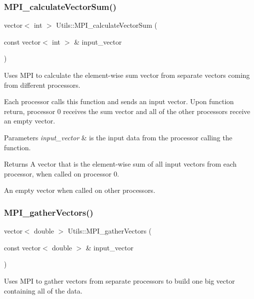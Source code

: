 \subsubsection{\texorpdfstring{M\+P\+I\+\_\+calculate\+Vector\+Sum()}{MPI\_calculateVectorSum()}\hspace{0.1cm}{\footnotesize\ttfamily [2/2]}}
{\footnotesize\ttfamily vector$<$ int $>$ Utils\+::\+M\+P\+I\+\_\+calculate\+Vector\+Sum (\begin{DoxyParamCaption}\item[{const vector$<$ int $>$ \&}]{input\+\_\+vector }\end{DoxyParamCaption})}



Uses M\+PI to calculate the element-\/wise sum vector from separate vectors coming from different processors. 

Each processor calls this function and sends an input vector. Upon function return, processor 0 receives the sum vector and all of the other processors receive an empty vector. 
\begin{DoxyParams}{Parameters}
{\em input\+\_\+vector} & is the input data from the processor calling the function. \\
\hline
\end{DoxyParams}
\begin{DoxyReturn}{Returns}
A vector that is the element-\/wise sum of all input vectors from each processor, when called on processor 0. 

An empty vector when called on other processors. 
\end{DoxyReturn}
\mbox{\label{namespace_utils_af9a7e13279f18cd8d36ca98a7943a7e8}} 
\subsubsection{\texorpdfstring{M\+P\+I\+\_\+gather\+Vectors()}{MPI\_gatherVectors()}}
{\footnotesize\ttfamily vector$<$ double $>$ Utils\+::\+M\+P\+I\+\_\+gather\+Vectors (\begin{DoxyParamCaption}\item[{const vector$<$ double $>$ \&}]{input\+\_\+vector }\end{DoxyParamCaption})}



Uses M\+PI to gather vectors from separate processors to build one big vector containing all of the data. 

